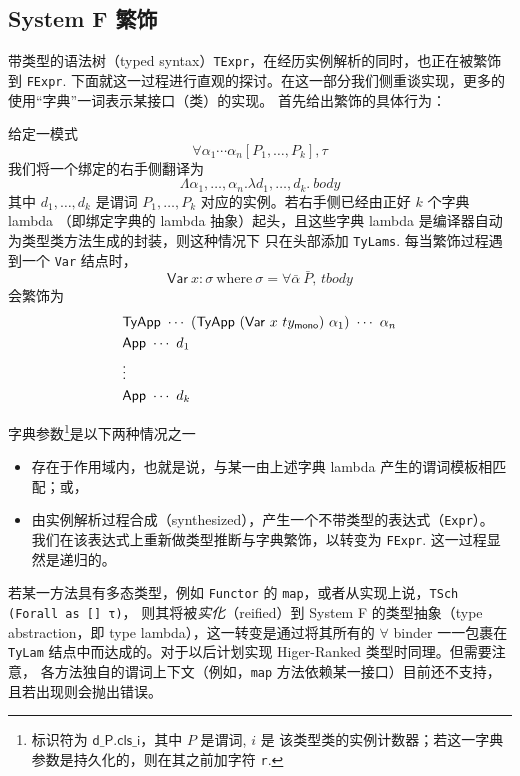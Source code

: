 \documentclass[a4paper, 11pt]{article}
\theoremstyle{remark}\newtheorem*{remark}{Remark}
\theoremstyle{definition}\newtheorem*{definition}{Definition}
\begin{document}
\subsection{System F 繁饰}
带类型的语法树（typed syntax）\texttt{TExpr}，在经历实例解析的同时，也正在被繁饰到 \texttt{FExpr}.
下面就这一过程进行直观的探讨。在这一部分我们侧重谈实现，更多的使用“字典”一词表示某接口（类）的实现。
首先给出繁饰的具体行为：

给定一模式
\[
  \forall \alpha_1 \cdots \alpha_n [P_1, \dots, P_k], \tau
\]
我们将一个绑定的右手侧翻译为
\[
  \Lambda \alpha_1,\dots,\alpha_n.\lambda d_1,\dots,d_k.\ body
\]
其中 $d_1,\dots,d_k$ 是谓词 $P_1,\dots,P_k$ 对应的实例。若右手侧已经由正好 $k$ 个字典 lambda
（即绑定字典的 lambda 抽象）起头，且这些字典 lambda 是编译器自动为类型类方法生成的封装，则这种情况下
只在头部添加 \texttt{TyLams}.
每当繁饰过程遇到一个 \texttt{Var} 结点时，
\[
  \mathsf{Var}\ x:\sigma\ \mathrm{where}\ \sigma = \forall \bar{\alpha}\ \bar{P},\, tbody
\]
会繁饰为
\begin{align*}
  &\Tyapp\ \cdots\ (\Tyapp\ (\FVar\ x\ ty_\mathsf{mono})\ \alpha_1)\ \cdots\ \alpha_n\\
  &\mathsf{App}\ \cdots\ d_1\\
  &\vdots\\
  &\mathsf{App}\ \cdots\ d_k
\end{align*}

字典参数\footnote{标识符为 $\mathsf{d}\_\mathsf{P.cls}\_\mathsf{i}$，其中 $P$ 是谓词, $i$ 是
该类型类的实例计数器；若这一字典参数是持久化的，则在其之前加字符 \texttt{r}.}是以下两种情况之一
\begin{itemize}\itemsep0em
  \item 存在于作用域内，也就是说，与某一由上述字典 lambda 产生的谓词模板相匹配；或，
  \item 由实例解析过程合成（synthesized），产生一个不带类型的表达式（\texttt{Expr}）。
    我们在该表达式上重新做类型推断与字典繁饰，以转变为 \texttt{FExpr}. 这一过程显然是递归的。
\end{itemize}

若某一方法具有多态类型，例如 \texttt{Functor} 的 \texttt{map}，或者从实现上说，\texttt{TSch (Forall as [] τ)}，
则其将被\emph{实化}（reified）到 System F 的类型抽象（type abstraction，即 type lambda），这一转变是通过将其所有的
$\forall$ binder 一一包裹在 \texttt{TyLam} 结点中而达成的。对于以后计划实现 Higer-Ranked 类型时同理。但需要注意，
各方法独自的谓词上下文（例如，\texttt{map} 方法依赖某一接口）目前还不支持，且若出现则会抛出错误。
\end{document}
